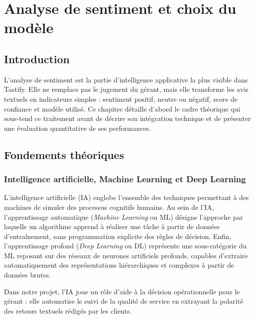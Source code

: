 \chapter{Analyse de sentiment et choix du modèle}
\label{chap:sentiment}

\section*{Introduction}
L'analyse de sentiment est la partie d'intelligence applicative la plus visible dans Tastify. Elle ne remplace pas le jugement du gérant, mais elle transforme les avis textuels en indicateurs simples : sentiment positif, neutre ou négatif, score de confiance et modèle utilisé. Ce chapitre détaille d'abord le cadre théorique qui sous-tend ce traitement avant de décrire son intégration technique et de présenter une évaluation quantitative de ses performances.

\section{Fondements théoriques}

\subsection{Intelligence artificielle, Machine Learning et Deep Learning}
L'intelligence artificielle (IA) englobe l'ensemble des techniques permettant à des machines de simuler des processus cognitifs humains. Au sein de l'IA, l'apprentissage automatique (\textit{Machine Learning} ou ML) désigne l'approche par laquelle un algorithme apprend à réaliser une tâche à partir de données d'entraînement, sans programmation explicite des règles de décision. Enfin, l'apprentissage profond (\textit{Deep Learning} ou DL) représente une sous-catégorie du ML reposant sur des réseaux de neurones artificiels profonds, capables d'extraire automatiquement des représentations hiérarchiques et complexes à partir de données brutes.

Dans notre projet, l'IA joue un rôle d'aide à la décision opérationnelle pour le gérant : elle automatise le suivi de la qualité de service en extrayant la polarité des retours textuels rédigés par les clients.

